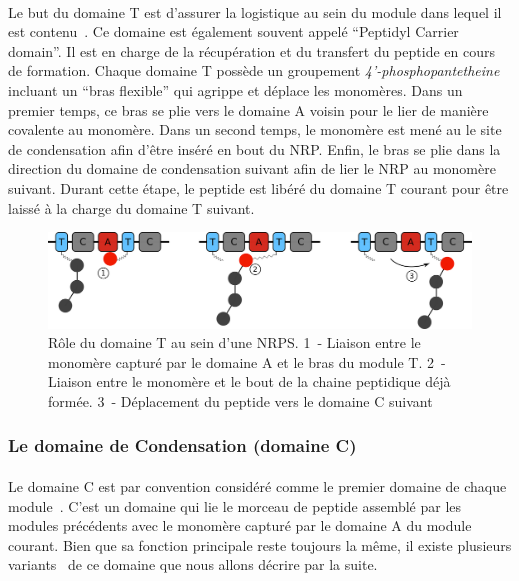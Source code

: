 \documentclass[12pt,french,twoside]{report}
\begin{document}
\paragraph{}Le but du domaine T est d'assurer la logistique au sein du module dans lequel il est contenu~\cite{stachelhaus_biochemical_1996,calcott_portability_2015}.
Ce domaine est également souvent appelé ``Peptidyl Carrier domain''.
Il est en charge de la récupération et du transfert du peptide en cours de formation.
Chaque domaine T possède un groupement \textit{4’-phosphopantetheine} incluant un ``bras flexible'' qui agrippe et déplace les monomères.
Dans un premier temps, ce bras se plie vers le domaine A voisin pour le lier de manière covalente au monomère.
Dans un second temps, le monomère est mené au le site de condensation afin d'être inséré en bout du NRP.
Enfin, le bras se plie dans la direction du domaine de condensation suivant afin de lier le NRP au monomère suivant.
Durant cette étape, le peptide est libéré du domaine T courant pour être laissé à la charge du domaine T suivant.

\begin{figure}[h!]
  \begin{center}
    \includegraphics[width=450px]{Figures/bio/Intro/T-domain.png}
    \caption{\label{T_domain}Rôle du domaine T au sein d'une NRPS.
    1~- Liaison entre le monomère capturé par le domaine A et le bras du module T.
    2~- Liaison entre le monomère et le bout de la chaine peptidique déjà formée.
    3~- Déplacement du peptide vers le domaine C suivant}
  \end{center}
\end{figure}

\subsubsection{Le domaine de Condensation (domaine C)}

\paragraph{}Le domaine C est par convention considéré comme le premier domaine de chaque module~\cite{stachelhaus_peptide_1998}.
C'est un domaine qui lie le morceau de peptide assemblé par les modules précédents avec le monomère capturé par le domaine A du module courant.
Bien que sa fonction principale reste toujours la même, il existe plusieurs variants~\cite{rausch_phylogenetic_2007} de ce domaine que nous allons décrire par la suite.
\end{document}
